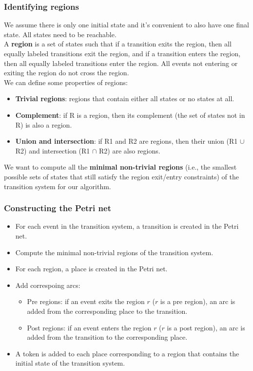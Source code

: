 \subsubsection*{Identifying regions}
We assume there is only one initial state and it's convenient to also have one final state. 
All states need to be reachable.
\\A \textbf{region} is a set of states such that if a transition exits the region, then all equally labeled transitions exit the region, and if a transition enters the region, then all equally labeled transitions enter the region.
All events not entering or exiting the region do not cross the region.
\\We can define some properties of regions:
\begin{itemize}
    \item \textbf{Trivial regions}: regions that contain either all states or no states at all.
    \item \textbf{Complement}: if R is a region, then its complement (the set of states not in R) is also a region.
    \item \textbf{Union and intersection}: if R1 and R2 are regions, then their union (R1 $\cup$ R2) and intersection (R1 $\cap$ R2) are also regions.
\end{itemize}
We want to compute all the \textbf{minimal non-trivial regions} (i.e., the smallest possible sets of states that still satisfy the region exit/entry constraints) of the transition system for our algorithm.

\subsubsection*{Constructing the Petri net}
\begin{itemize}
    \item For each event in the transition system, a transition is created in the Petri net.
    \item Compute the minimal non-trivial regions of the transition system.
    \item For each region, a place is created in the Petri net.
    \item Add correspoing arcs:
    \begin{itemize}
        \item Pre regions: if an event exits the region $r$ ($r$ is a pre region), an arc is added from the corresponding place to the transition.
        \item Post regions: if an event enters the region $r$ ($r$ is a post region), an arc is added from the transition to the corresponding place.
    \end{itemize}
    \item A token is added to each place corresponding to a region that contains the initial state of the transition system.
\end{itemize}

